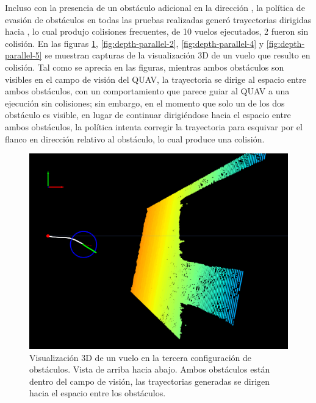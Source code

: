 Incluso con la presencia de un obstáculo adicional en la dirección , la política de evasión de obstáculos en todas las pruebas realizadas generó trayectorias dirigidas hacia , lo cual produjo colisiones frecuentes, de 10 vuelos ejecutados, 2 fueron sin colisión. En las figuras \ref{fig:depth-parallel-1}, \ref{fig:depth-parallel-2},  \ref{fig:depth-parallel-4} y \ref{fig:depth-parallel-5} se muestran capturas de la visualización 3D de un vuelo que resulto en colisión. Tal como se aprecia en las figuras, mientras ambos obstáculos son visibles en el campo de visión del QUAV, la trayectoria se dirige al espacio entre ambos obstáculos, con un comportamiento que parece guiar al QUAV a una ejecución sin colisiones; sin embargo, en el momento que solo un de los dos obstáculo es visible, en lugar de continuar dirigiéndose hacia el espacio entre ambos obstáculos, la política intenta corregir la trayectoria para esquivar por el flanco en dirección  relativo al obstáculo, lo cual produce una colisión. 

\begin{figure}[H]
    \centering
    \includegraphics[scale=0.3]{partes/img/depth-parallel-1-topdown.png}
    \caption[Visualización 3D de un vuelo en la tercera configuración de obstáculos. Vista de arriba hacia abajo.]{Visualización 3D de un vuelo en la tercera configuración de obstáculos. Vista de arriba hacia abajo. Ambos obstáculos están dentro del campo de visión, las trayectorias generadas se dirigen hacia el espacio entre los obstáculos.}
    \label{fig:depth-parallel-1}
\end{figure}

